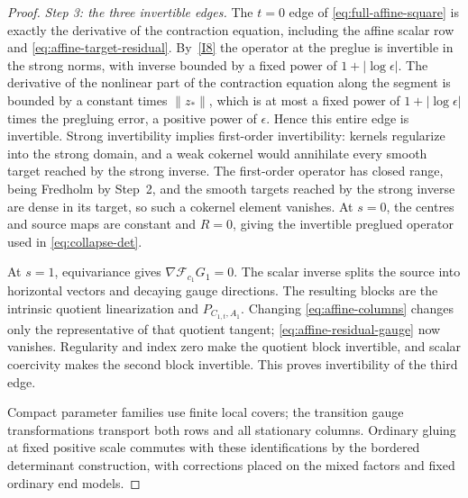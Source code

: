 \documentclass[11pt]{amsart}
\theoremstyle{definition}
\theoremstyle{remark}
\theoremstyle{plain}
\numberwithin{equation}{section}
\begin{document}
\begin{proof}
\emph{Step 3: the three invertible edges.} The $t=0$ edge of \eqref{eq:full-affine-square} is exactly the derivative of the
contraction equation, including the affine scalar row and
\eqref{eq:affine-target-residual}. By~\ref{I8} the operator at the preglue is invertible in the strong
norms, with inverse bounded by a fixed power of $1+|\log\epsilon|$. The
derivative of the nonlinear part of the contraction equation along the
segment is bounded by a constant times $\|z_*\|$, which is at most a
fixed power of $1+|\log\epsilon|$ times the pregluing error, a positive
power of $\epsilon$. Hence this entire edge is invertible. Strong invertibility
implies first-order invertibility: kernels regularize into the
strong domain, and a weak cokernel would annihilate every smooth
target reached by the strong inverse. The first-order operator has closed
range, being Fredholm by Step~2, and the smooth targets reached by the
strong inverse are dense in its target, so such a cokernel element
vanishes. At $s=0$, the centres and source maps
are constant and $R=0$, giving the invertible preglued operator
used in \eqref{eq:collapse-det}.

At $s=1$, equivariance gives $\nabla\mathcal F_{c_1}G_1=0$.
The scalar inverse splits the source into horizontal vectors
and decaying gauge directions. The resulting blocks are the
intrinsic quotient linearization and $P_{C_{1,t},A_1}$. Changing
\eqref{eq:affine-columns} changes only the representative of
that quotient tangent; \eqref{eq:affine-residual-gauge} now
vanishes. Regularity and index zero make the quotient block
invertible, and scalar coercivity makes the second block
invertible. This proves invertibility of the third edge.

Compact parameter families use finite local covers; the transition
gauge transformations transport both rows and all stationary columns.
Ordinary gluing at fixed positive scale commutes with these
identifications by the bordered determinant construction, with
corrections placed on the mixed factors and fixed ordinary end models.
\end{proof}
\end{document}
